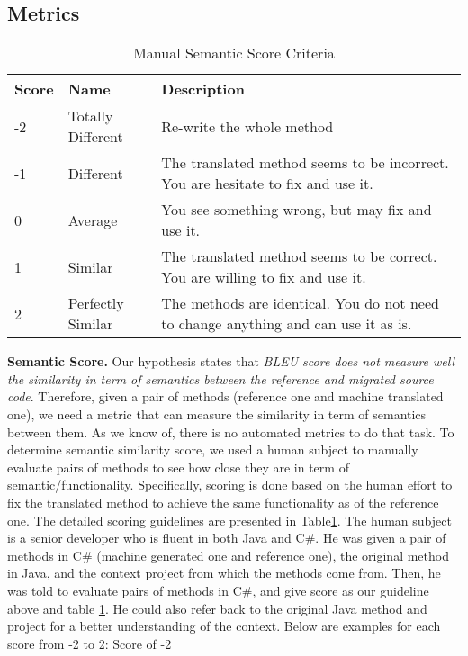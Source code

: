 \subsection{Metrics}
\begin{table}
\begin{tabular}{|p{0.7cm}|p{1.5cm}|p{5cm}|}
\hline
Score & Name & Description \\
\hline
-2 & Totally Different & Re-write the whole method \\
\hline
-1 &  Different & The translated method seems to be incorrect. You are hesitate to fix and use it. \\
\hline
0 & Average & You see something wrong, but may fix and use it. \\
\hline
1 & Similar & The translated method seems to be correct. You are willing to fix and use it. \\
\hline
2 & Perfectly Similar & The methods are identical. You do not need to change anything and can use it as is. \\
\hline
\end{tabular}
\caption{Manual Semantic Score Criteria}
\label{table:criteria}
\end{table}
\textbf{Semantic Score.}
Our hypothesis states that \emph{\textit{BLEU score does not measure well the similarity in term of semantics between the reference and migrated source code}}. Therefore, given a pair of methods (reference one and machine translated one), we need a metric that can measure the similarity in term of semantics between them. As we know of, there is no automated metrics to do that task. To determine semantic similarity score, we used a human subject to manually evaluate pairs of methods to see how close they are in term of semantic/functionality. Specifically, scoring is done based on the human effort to fix the translated method to achieve the same functionality as of the reference one. The detailed scoring guidelines are presented in Table\ref{table:criteria}. The human subject is a senior developer who is fluent in both Java and C\#. He was given a pair of methods in C\# (machine generated one and reference one), the original method in Java, and the context project from which the methods come from. Then, he was told to evaluate pairs of methods in C\#, and give score as our guideline above and table \ref{table:criteria}. He could also refer back to the original Java method and project for a better understanding of the context. Below are examples for each score from -2 to 2:
Score of -2 \\
